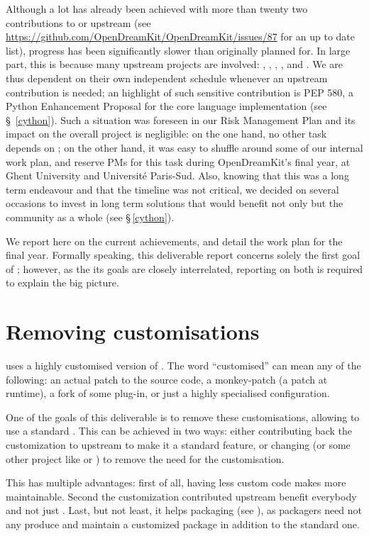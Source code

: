 \documentclass{deliverablereport}
\begin{document}
Although a lot has already been achieved with more than twenty two
contributions to \Sage or upstream (see
\url{https://github.com/OpenDreamKit/OpenDreamKit/issues/87} for an up
to date list), progress has been
significantly slower than originally planned for. In large part, this
is because many upstream projects are involved: \Sphinx, \Docutils,
\Pygments, \Cython, and \Python. We are thus dependent on their own
independent schedule whenever an upstream contribution is needed;
an highlight of such sensitive contribution is PEP 580, a Python
Enhancement Proposal for the core language implementation (see \S~\ref{cython}). Such
a situation was foreseen in our Risk Management Plan and its impact on
the overall project is negligible: on the one hand, no other task
depends on ; on the other hand, it was easy to
shuffle around some of our internal work plan, and reserve PMs
for this task during OpenDreamKit's final year, at Ghent University
and Université Paris-Sud. Also, knowing that this was a long term
endeavour and that the timeline was not critical, we decided on
several occasions to invest in long term solutions that would benefit
not only \Sage but the community as a whole (see \S\,\ref{cython}).

We report here on the current achievements, and detail the work plan for the
final year. Formally speaking, this deliverable report concerns solely the
first goal of ; however, as the its goals are closely interrelated, reporting on
both is required to explain the big picture.

\section{Removing \Sage customisations}

\Sage uses a highly customised version of \Sphinx.
The word ``customised'' can mean any of the following:
an actual patch to the source code,
a monkey-patch (a patch at runtime),
a fork of some plug-in, or just a highly specialised configuration.

One of the goals of this deliverable is to remove these
customisations, allowing \Sage to use a standard \Sphinx.
This can be achieved in two ways:
either contributing back the customization to upstream \Sphinx to make
it a standard feature,
or changing \Sage (or some other project like \Cython or \Python)
to remove the need for the customisation.

This has multiple advantages:
first of all, having less custom code makes \Sage more maintainable.
Second the customization contributed upstream benefit everybody
and not just \Sage. Last, but not least, it helps packaging \Sage
(see ),
as packagers need not any produce and maintain a customized \Sphinx
package in addition to the standard one.
\end{document}
